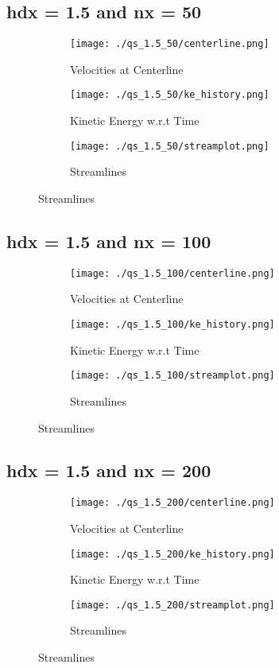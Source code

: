\documentclass[12pt, a4paper]{report}
\begin{document}
\subsection{hdx = 1.5 and nx = 50}
\begin{figure}[H]
\begin{subfigure}{0.5\textwidth}
	\texttt{[image: ./qs\_1.5\_50/centerline.png]}
	\caption{Velocities at Centerline}
\end{subfigure}
\begin{subfigure}{0.5\textwidth}
	\texttt{[image: ./qs\_1.5\_50/ke\_history.png]}
	\caption{Kinetic Energy w.r.t Time}
\end{subfigure}
\medskip
\begin{subfigure}{\textwidth}
	\centering
	\texttt{[image: ./qs\_1.5\_50/streamplot.png]}
	\caption{Streamlines}
\end{subfigure}
\end{figure}

\subsection{hdx = 1.5 and nx = 100}
\begin{figure}[H]
\begin{subfigure}{0.5\textwidth}
	\texttt{[image: ./qs\_1.5\_100/centerline.png]}
	\caption{Velocities at Centerline}
\end{subfigure}
\begin{subfigure}{0.5\textwidth}
	\texttt{[image: ./qs\_1.5\_100/ke\_history.png]}
	\caption{Kinetic Energy w.r.t Time}
\end{subfigure}
\medskip
\begin{subfigure}{\textwidth}
	\texttt{[image: ./qs\_1.5\_100/streamplot.png]}
	\caption{Streamlines}
\end{subfigure}
\end{figure}

\subsection{hdx = 1.5 and nx = 200}
\begin{figure}[H]
\begin{subfigure}{0.5\textwidth}
	\texttt{[image: ./qs\_1.5\_200/centerline.png]}
	\caption{Velocities at Centerline}
\end{subfigure}
\begin{subfigure}{0.5\textwidth}
	\texttt{[image: ./qs\_1.5\_200/ke\_history.png]}
	\caption{Kinetic Energy w.r.t Time}
\end{subfigure}
\medskip
\begin{subfigure}{\textwidth}
	\texttt{[image: ./qs\_1.5\_200/streamplot.png]}
	\caption{Streamlines}
\end{subfigure}
\end{figure}
\end{document}
